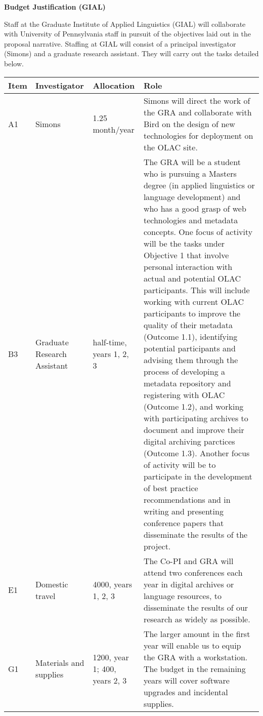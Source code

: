 \documentclass[11pt]{nsf}
\begin{document}
\begin{center}\textbf{\Large
Budget Justification (GIAL)
}\end{center}

Staff at the Graduate Institute of Applied Linguistics (GIAL) will
collaborate with University of Pennsylvania staff in pursuit of the
objectives laid out in the proposal narrative.
Staffing at GIAL will consist of a principal investigator (Simons)
and a graduate research assistant.  They will carry out the tasks
detailed below.

\vspace{1ex}

{\small\noindent
\begin{tabular}{lllp{3in}}
\textbf{Item} &
\textbf{Investigator} & \textbf{Allocation} & \textbf{Role} \\ \hline

A1 & Simons & 1.25 month/year &
Simons will direct the work of the GRA and collaborate with Bird
on the design of new technologies for deployment on the OLAC site.\\

B3 & Graduate Research Assistant & half-time, years 1, 2, 3 &
The GRA will be a student who is pursuing a Masters degree (in 
applied linguistics or language development) and who has a good grasp of web technologies and
metadata concepts. One focus of activity will be
the tasks under Objective 1 that involve personal interaction
with actual and potential OLAC participants.  This will include
working with current OLAC participants to improve the quality of their
metadata (Outcome 1.1), identifying potential participants and advising
them through the process of developing a metadata repository and registering with
OLAC (Outcome 1.2), and working with participating archives to document
and improve their digital archiving parctices (Outcome 1.3). 
Another focus of activity will be to participate
in the development of best practice recommendations and in
writing and presenting conference papers 
that disseminate the results of the project.\\

E1 & Domestic travel & 4000, years 1, 2, 3 &
The Co-PI and GRA will attend two conferences each year in digital archives or
language resources, to disseminate the results of our research as
widely as possible.\\

G1 & Materials and supplies & 1200, year 1; 400, years 2, 3 &
The larger amount in the first year will enable us
to equip the GRA with a workstation.  The budget in the remaining years
will cover software upgrades and incidental supplies.\\

\end{tabular}}
\end{document}
